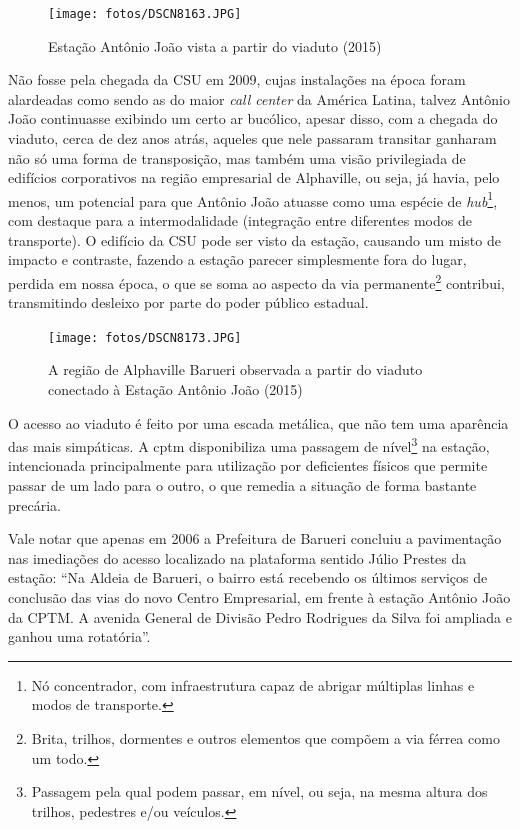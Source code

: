 	\begin{figure}[h]
		\caption{Estação Antônio João vista a partir do viaduto (2015)}
		\texttt{[image: fotos/DSCN8163.JPG]}
	\end{figure}
	
	Não fosse pela chegada da CSU em 2009, cujas instalações na época foram alardeadas como sendo as do maior \textit{call center} da América Latina\cite{investesp}, talvez Antônio João continuasse exibindo um certo ar bucólico, apesar disso, com a chegada do viaduto, cerca de dez anos atrás, aqueles que nele passaram transitar ganharam não só uma forma de transposição, mas também uma visão privilegiada de edifícios corporativos na região empresarial de Alphaville, ou seja, já havia, pelo menos, um potencial para que Antônio João atuasse como uma espécie de \textit{hub}\footnote{Nó concentrador, com infraestrutura capaz de abrigar múltiplas linhas e modos de transporte.}, com destaque para a intermodalidade (integração entre diferentes modos de transporte). O edifício da CSU pode ser visto da estação, causando um misto de impacto e contraste, fazendo a estação parecer simplesmente fora do lugar, perdida em nossa época, o que se soma ao aspecto da via permanente\footnote{Brita, trilhos, dormentes e outros elementos que compõem a via férrea como um todo.} contribui, transmitindo desleixo por parte do poder público estadual.
	
	\begin{figure}[h]
		\caption{A região de Alphaville Barueri observada a partir do viaduto conectado à Estação Antônio João (2015)}
		\texttt{[image: fotos/DSCN8173.JPG]}
	\end{figure}
	
	O acesso ao viaduto é feito por uma escada metálica, que não tem uma aparência das mais simpáticas. A \gls{cptm} disponibiliza uma passagem de nível\footnote{Passagem pela qual podem passar, em nível, ou seja, na mesma altura dos trilhos, pedestres e/ou veículos.} na estação, intencionada principalmente para utilização por deficientes físicos que permite passar de um lado para o outro, o que remedia a situação de forma bastante precária.
	
	Vale notar que apenas em 2006 a Prefeitura de Barueri concluiu a pavimentação nas imediações do acesso localizado na plataforma sentido Júlio Prestes da estação: ``Na Aldeia de Barueri, o bairro está recebendo os últimos serviços de conclusão das vias do novo Centro Empresarial, em frente à estação Antônio João da CPTM. A avenida General de Divisão Pedro Rodrigues da Silva foi ampliada e ganhou uma rotatória''\cite{barueri}.

